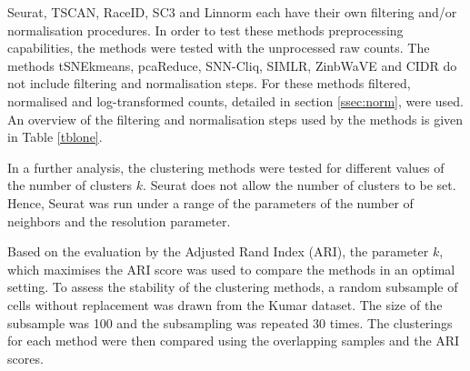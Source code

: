\documentclass[11pt, a4paper]{article}\usepackage[]{graphicx}\usepackage[]{color}
\begin{document}
Seurat, TSCAN, RaceID, SC3 and Linnorm each have their own filtering and/or normalisation procedures. In order to test these methods preprocessing capabilities, the methods were tested with the unprocessed raw counts.
The methods tSNEkmeans, pcaReduce, SNN-Cliq, SIMLR, ZinbWaVE and CIDR do not include filtering and normalisation steps. For these methods filtered, normalised and log-transformed counts, detailed in section \ref{ssec:norm}, were used. An overview of the filtering and normalisation steps used by the methods is given in Table \ref{tblone}.

In a further analysis, the clustering methods were tested for different values of the number of clusters $k$. Seurat does not allow the number of clusters to be set. Hence, Seurat was run under a range of the parameters of the number of neighbors and the resolution parameter.

Based on the evaluation by the Adjusted Rand Index (ARI), the parameter $k$, which maximises the ARI score was used to compare the methods in an optimal setting. To assess the stability of the clustering methods, a random subsample of cells without replacement was drawn from the Kumar dataset. The size of the subsample was 100 and the subsampling was repeated 30 times. The clusterings for each method were then compared using the overlapping samples and the ARI scores.  
\end{document}
